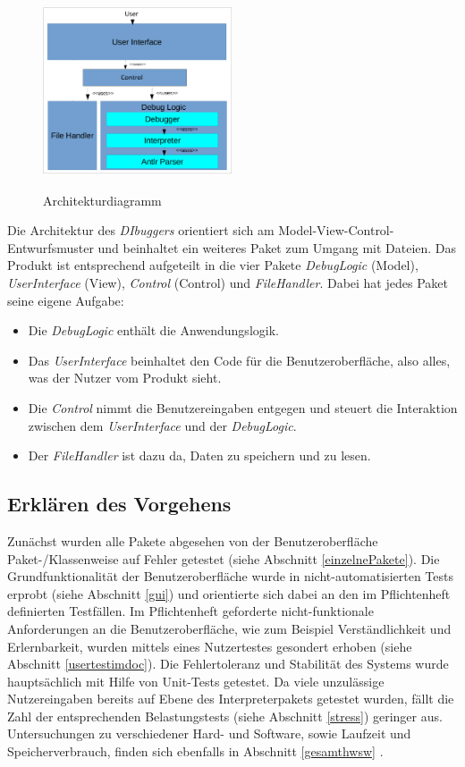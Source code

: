 \documentclass[parskip=full]{scrartcl}
\begin{document}
\begin{figure}[!h]
\centering
\includegraphics[width=0.5\textwidth]{../Plichtenheft/Architektur.png} \\
\caption{Architekturdiagramm}
\label{Architekturdiagramm}
\end{figure}
Die Architektur des \textit{DIbuggers} orientiert sich am Model-View-Control-Entwurfsmuster und beinhaltet ein weiteres Paket zum Umgang mit Dateien. Das Produkt ist entsprechend aufgeteilt in die vier Pakete \textit{DebugLogic} (Model), \textit{UserInterface} (View),  \textit{Control} (Control) und \textit{FileHandler}. 
Dabei hat jedes Paket seine eigene Aufgabe:
\begin{itemize}
\item Die \textit{DebugLogic} enthält die Anwendungslogik.
\item Das \textit{UserInterface} beinhaltet den Code für die Benutzeroberfläche, also alles, was der Nutzer vom Produkt sieht.
\item Die \textit{Control} nimmt die Benutzereingaben entgegen und steuert die Interaktion zwischen dem \textit{UserInterface} und der \textit{DebugLogic}.
\item Der \textit{FileHandler} ist dazu da, Daten zu speichern und zu lesen.
\end{itemize}


\subsection{Erklären des Vorgehens}
Zunächst wurden alle Pakete abgesehen von der Benutzeroberfläche Paket-/Klassenweise auf Fehler getestet (siehe Abschnitt \ref{einzelnePakete}).
Die Grundfunktionalität der Benutzeroberfläche wurde in nicht-automatisierten Tests erprobt (siehe Abschnitt \ref{gui}) und orientierte sich dabei an den im Pflichtenheft definierten Testfällen. Im Pflichtenheft geforderte nicht-funktionale Anforderungen an die Benutzeroberfläche, wie zum Beispiel Verständlichkeit und Erlernbarkeit, wurden mittels eines Nutzertestes gesondert erhoben (siehe Abschnitt \ref{usertestimdoc}).
Die Fehlertoleranz und Stabilität des Systems wurde hauptsächlich mit Hilfe von Unit-Tests getestet. Da viele unzulässige Nutzereingaben bereits auf Ebene des Interpreterpakets getestet wurden, fällt die Zahl der entsprechenden Belastungstests (siehe Abschnitt \ref{stress}) geringer aus. Untersuchungen zu verschiedener Hard- und Software, sowie Laufzeit und Speicherverbrauch, finden sich ebenfalls in Abschnitt \ref{gesamthwsw} .
\end{document}
